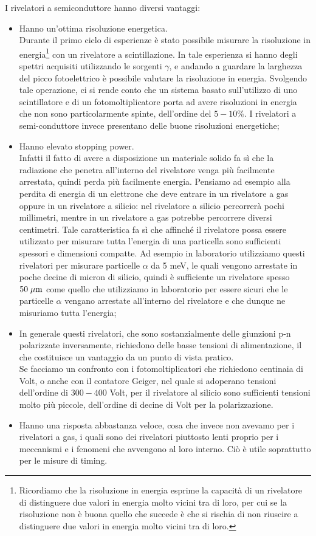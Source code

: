 I rivelatori a semiconduttore hanno diversi vantaggi:
\begin{itemize}[leftmargin=0.5cm]
   \item Hanno un'ottima risoluzione energetica.\\
   Durante il primo ciclo di esperienze è stato possibile misurare la risoluzione in energia\footnote{Ricordiamo che la risoluzione in energia esprime la capacità di un rivelatore di distinguere due valori in energia molto vicini tra di loro, per cui se la risoluzione non è buona quello che succede è che si rischia di non riuscire a distinguere due valori in energia molto vicini tra di loro.} con un rivelatore a scintillazione. In tale esperienza si hanno degli spettri acquisiti utilizzando le sorgenti $\gamma$, e andando a guardare la larghezza del picco fotoelettrico è possibile valutare la risoluzione in energia. Svolgendo tale operazione, ci si rende conto che un sistema basato sull'utilizzo di uno scintillatore e di un fotomoltiplicatore porta ad avere risoluzioni in energia che non sono particolarmente spinte, dell'ordine del $5-10\%$. I rivelatori a semi-conduttore invece presentano delle buone risoluzioni energetiche;
   \item Hanno elevato stopping power.\\
   Infatti il fatto di avere a disposizione un materiale solido fa sì che la radiazione che penetra all'interno del rivelatore venga più facilmente arrestata, quindi perda più facilmente energia. Pensiamo ad esempio alla perdita di energia di un elettrone che deve entrare in un rivelatore a gas oppure in un rivelatore a silicio: nel rivelatore a silicio percorrerà pochi millimetri, mentre in un rivelatore a gas potrebbe percorrere diversi centimetri. Tale caratteristica fa sì che affinché il rivelatore possa essere utilizzato per misurare tutta l'energia di una particella sono sufficienti spessori e dimensioni compatte. Ad esempio in laboratorio utilizziamo questi rivelatori per misurare particelle $\alpha$ da 5 meV, le quali vengono arrestate in poche decine di micron di silicio, quindi è sufficiente un rivelatore spesso $50 \; \rm \mu m$ come quello che utilizziamo in laboratorio per essere sicuri che le particelle $\alpha$ vengano arrestate all'interno del rivelatore e che dunque ne misuriamo tutta l'energia;
   \item In generale questi rivelatori, che sono sostanzialmente delle giunzioni p-n polarizzate inversamente, richiedono delle basse tensioni di alimentazione, il che costituisce un vantaggio da un punto di vista pratico.\\
   Se facciamo un confronto con i fotomoltiplicatori che richiedono centinaia di Volt, o anche con il contatore Geiger, nel quale si adoperano tensioni dell'ordine di $300-400$ Volt, per il rivelatore al silicio sono sufficienti tensioni molto più piccole, dell'ordine di decine di Volt per la polarizzazione.
   \item Hanno una risposta abbastanza veloce, cosa che invece non avevamo per i rivelatori a gas, i quali sono dei rivelatori piuttosto lenti proprio per i meccanismi e i fenomeni che avvengono al loro interno. Ciò è utile soprattutto per le misure di timing.
\end{itemize}

